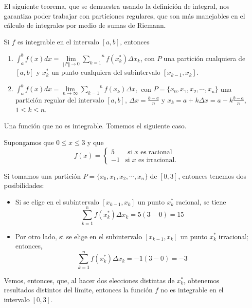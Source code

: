 
El siguiente teorema, que se demuestra usando la definición de integral, nos garantiza poder trabajar con particiones regulares, que son más manejables en el cálculo de integrales por medio de sumas de Riemann.

\begin{teorema}
\textnormal{Si \textit{$f$} es integrable en el intervalo \textit{$[a,b]$}, entonces}
\begin{enumerate}
\item $\displaystyle{\int_{a}^{b}f(x)dx}=\underset{\left\Vert P\right\Vert \rightarrow 0}{\lim }\overset{n}{\underset{k=1}{\sum }}f(x_{k}^{\ast })\Delta x_{k}$, \textnormal{con \textit{$P$} una partición cualquiera de \textit{$[a,b]$} y \textit{$x_{k}^{\ast }$} un punto cualquiera del subintervalo \textit{$\left[ x_{k-1},x_{k}\right].$}}

\item $\displaystyle{\int_{a}^{b}f(x)dx}=\underset{n\rightarrow \infty }{\lim }\overset{n}{\underset{k=1}{\sum }}f(x_{k})\Delta x,$ con $P=\{x_{0},x_{1},x_{2},\cdots ,x_{n}\}$ una partición regular del intervalo $[a,b]$, $\Delta x=\frac{b-a}{n}$ y $x_{k}=a+k\Delta x=a+k\frac{b-a}{n},$ $1\leq k\leq n.$
\end{enumerate}
\end{teorema}

\begin{ejemplo} \textnormal{Una función que no es integrable. Tomemos el siguiente caso.}
\end{ejemplo}
Supongamos que $0\leq x\leq 3$ y que
\[
f(x)=\begin{cases}
5 & \text{ si $x$ es racional}\\
-1 & \text{si $x$ es irracional}.
\end{cases}
\]

Si tomamos una partición $P=\{x_{0},x_{1},x_{2},\cdots ,x_{n}\}$ de $[0,3]$,
entonces tenemos dos posibilidades:
\begin{itemize}[leftmargin=1.2em, itemindent=0pt,     labelwidth=,labelsep=0.5em,]


\item Si se elige en el subintervalo $\left[ x_{k-1},x_{k}\right] $ un punto $x_{k}^{\ast }$ racional, se tiene
\[
\overset{n}{\underset{k=1}{\sum }}f(x_{k}^{\ast })\Delta x_{k}=5\left(
3-0\right) =15
\]

\item Por otro lado, si se elige en el subintervalo $\left[x_{k-1},x_{k}\right]$ un punto $x_{k}^{\ast }$ irracional; entonces,
\[
\overset{n}{\underset{k=1}{\sum }}f(x_{k}^{\ast })\Delta x_{k}=-1\left(
3-0\right)=-3
\]
\end{itemize}
Vemos, entonces, que, al hacer dos elecciones distintas de $x_k^*$, obtenemos resultados distintos del límite, entonces la función $f$ no es integrable en el intervalo $[0,3].$

